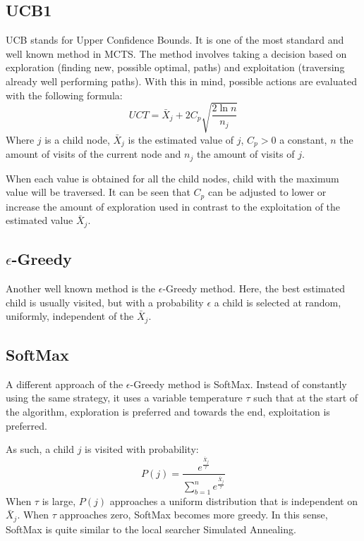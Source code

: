 \documentclass{acm_proc_article-sp}
\begin{document}
\subsection{UCB1}
UCB stands for Upper Confidence Bounds. It is one of the most standard and well known method in MCTS. The method involves taking a decision based on exploration (finding new, possible optimal, paths) and exploitation (traversing already well performing paths). With this in mind, possible actions are evaluated with the following formula:
\begin{equation}
UCT = \bar{X}_j + 2 C_p\sqrt{\frac{2 \ln n}{n_j}}
\end{equation}
Where $j$ is a child node, $\bar{X}_j$ is the estimated value of $j$, $C_p > 0$ a constant, $n$ the amount of visits of the current node and $n_j$ the amount of visits of $j$.

When each value is obtained for all the child nodes, child with the maximum value will be traversed. It can be seen that $C_p$ can be adjusted to lower or increase the amount of exploration used in contrast to the exploitation of the estimated value $\bar{X}_j$.

\subsection{$\epsilon$-Greedy}

Another well known method is the $\epsilon$-Greedy method. Here, the best estimated child is usually visited, but with a probability $\epsilon$ a child is selected at random, uniformly, independent of the $\bar{X}_j$.

\subsection{SoftMax}
A different approach of the $\epsilon$-Greedy method is SoftMax. Instead of constantly using the same strategy, it uses a variable temperature $\tau$ such that at the start of the algorithm, exploration is preferred and towards the end, exploitation is preferred. 

As such, a child $j$ is visited with probability:
\begin{equation}
P(j) = \frac{e^\frac{\bar{X}_j}{\tau}}{\sum_{b=1}^{n} e^\frac{\bar{X}_j}{\tau}}
\end{equation}
When $\tau$ is large, $P(j)$ approaches a uniform distribution that is independent on $\bar{X}_j$. When $\tau$ approaches zero, SoftMax becomes more greedy. In this sense, SoftMax is quite similar to the local searcher Simulated Annealing.
\end{document}
